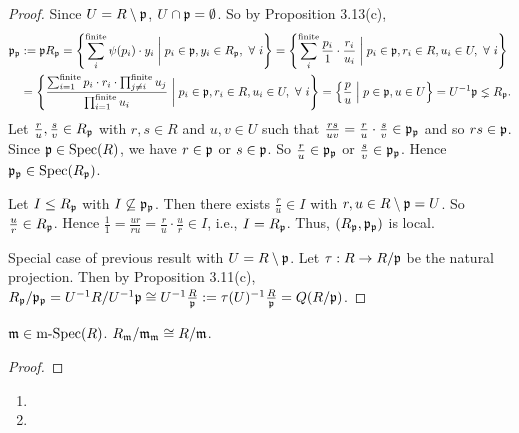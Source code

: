 \begin{proof} 
    Since $U = R \setminus \mathfrak{p}$, $U \cap \mathfrak{p} = \emptyset$. So by Proposition 3.13(c),
    \begin{align*}
        \mathfrak{p}_{\mathfrak{p}} &:= \mathfrak{p} R_{\mathfrak{p}} = \left\{\sum_{i}^{\text{finite}} \psi(p_{i}) \cdot y_{i} \mathrel{\bigg |} p_{i} \in \mathfrak{p},y_{i} \in R_{\mathfrak{p}}, \ \forall \  i\right\} = \left\{\sum_{i}^{\text{finite}} \frac{p_{i}}{1} \cdot \frac{r_{i}}{u_{i}} \mathrel{\bigg |} p_{i} \in \mathfrak{p}, r_{i} \in R, u_{i} \in U, \ \forall \  i\right\} \\
        &= \left\{\frac{\sum_{i=1}^{\text{finite}}p_{i} \cdot r_{i} \cdot \prod_{j \neq i}^{\text{finite}}u_{j}}{\prod_{i=1}^{\text{finite}}u_{i}} \mathrel{\bigg |} p_{i} \in \mathfrak{p}, r_{i} \in R, u_{i} \in U, \ \forall \  i\right\} = \left\{ \frac{p}{u} \mathrel{\Big |} p \in \mathfrak{p}, u \in U\right\} = U^{-1} \mathfrak{p} \lneq R_{\mathfrak{p}}.
    \end{align*}
    Let $\frac{r}{u},\frac{s}{v} \in R_{\mathfrak{p}}$ with $r,s \in R$ and $u,v \in U$ such that $\frac{rs}{uv} = \frac{r}{u} \cdot \frac{s}{v} \in \mathfrak{p}_{\mathfrak{p}}$ and so $rs \in \mathfrak{p}$. Since $\mathfrak{p} \in \operatorname{Spec}(R)$, we have $r \in \mathfrak{p}$ or $s \in \mathfrak{p}$. So $\frac{r}{u} \in \mathfrak{p}_{\mathfrak{p}}$ or $\frac{s}{v} \in \mathfrak{p}_{\mathfrak{p}}$. Hence $\mathfrak{p}_{\mathfrak{p}} \in \operatorname{Spec}(R_{\mathfrak{p}})$. \par 
    Let $I \leq R_{\mathfrak{p}}$ with $I \not \subseteq \mathfrak{p}_{\mathfrak{p}}$. Then there exists $\frac{r}{u} \in I$ with $r,u \in R \setminus \mathfrak{p} = U$. So $\frac{u}{r} \in R_{\mathfrak{p}}$. Hence $\frac{1}{1} = \frac{ur}{ru} = \frac{r}{u} \cdot \frac{u}{r} \in I$, i.e., $I = R_{\mathfrak{p}}$. Thus, $(R_{\mathfrak{p}},\mathfrak{p}_{\mathfrak{p}})$ is local. \par
    Special case of previous result with $U = R \setminus \mathfrak{p}$. Let $\tau: R \to R/\mathfrak{p}$ be the natural projection. Then by Proposition 3.11(c), $R_{\mathfrak{p}}/\mathfrak{p}_{\mathfrak{p}} = U^{-1}R/U^{-1}\mathfrak{p} \cong U^{-1} \frac{R}{\mathfrak{p}} := \tau(U)^{-1} \frac{R}{\mathfrak{p}} = Q(R/\mathfrak{p})$.
\end{proof}

\begin{corollary}
    $\mathfrak{m} \in \operatorname{m-Spec}(R)$. $R_{\mathfrak{m}}/\mathfrak{m}_{\mathfrak{m}} \cong R/\mathfrak{m}$.
\end{corollary}

\begin{proof}

\end{proof}

\begin{example*}
    \begin{enumerate}
        \item 
        \item 
    \end{enumerate}
\end{example*}

